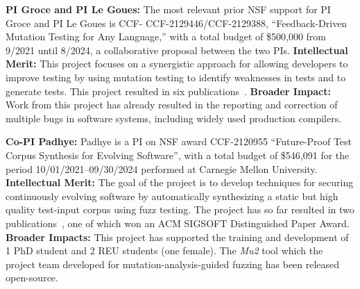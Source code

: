 \vspace{1ex}
\noindent\textbf{PI Groce and PI Le Goues:}
The most relevant prior NSF support for PI Groce and PI Le Goues is CCF-
CCF-2129446/CCF-2129388, ``Feedback-Driven Mutation Testing for Any Language,'' with a 
total budget of \$500,000 from 9/2021 until 8/2024,
a collaborative proposal between the two PIs. {\bf Intellectual Merit:} This project
focuses on a synergistic approach for allowing developers
to improve testing by using mutation testing to identify
weaknesses in tests and to generate tests.  This project resulted in six
publications~\cite{cc2022,seip2022,fuzzing22,fse23,issre23, FSE24UM}. {\bf
  Broader
  Impact:}  Work from this project has already
resulted in the reporting and correction of multiple bugs in software
systems, including widely used production compilers.


\vspace{1ex}
\noindent\textbf{Co-PI Padhye:}
Padhye is a PI on NSF award CCF-2120955 ``Future-Proof Test Corpus Synthesis for Evolving Software'',
with a total budget of 	\$546,091 for the period 10/01/2021--09/30/2024 performed 
at Carnegie Mellon University. 
{\bf Intellectual Merit:} The goal of the project is to develop techniques for securing continuously evolving software 
by automatically synthesizing a static but high quality test-input corpus using 
fuzz testing. The project has so far resulted in two publications~\cite{naturalfuzz, mu2}, one
of which won an ACM SIGSOFT Distinguished Paper Award. {\bf Broader Impacts:} 
This project has supported the training and development of 1 PhD student and 
2 REU students (one female). The \emph{Mu2} tool which the project team developed
for mutation-analysis-guided fuzzing has been released open-source. 

